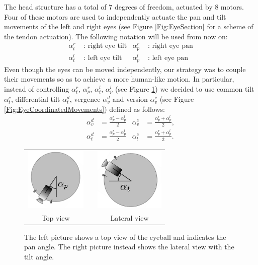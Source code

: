 The head structure has a total of 7 degrees of freedom, actuated by 8 motors. Four of these motors are used to independently actuate the pan and tilt movements of the left and right eyes (see Figure \ref{Fig:EyeSection} for a scheme of the tendon actuation). The following notation will be used from now on:
\begin{align*}
\alpha_t^r & \mbox{ : } \mbox{right eye tilt} & \alpha_p^r & \mbox{ : } \mbox{right eye pan}\\
\alpha_t^l & \mbox{ : } \mbox{left eye tilt} & \alpha_p^l & \mbox{ : } \mbox{left eye pan}
\end{align*}
Even though the eyes can be moved independently, our strategy was to couple their movements so as to achieve a more human-like motion. In particular, instead of controlling $\alpha_t^r$, $\alpha_p^r$, $\alpha_t^l$, $\alpha_p^l$ (see Figure \ref{Fig:EyePanTilt}) we decided to use common tilt $\alpha_t^c$, differential tilt $\alpha_t^d$, vergence $\alpha_v^d$ and version $\alpha_v^c$ (see Figure \ref{Fig:EyeCoordinatedMovements}) defined as follows:
\begin{align*}
\alpha_v^d & = \frac{\alpha_p^r - \alpha_p^l}{2} & \alpha_v^c & = \frac{\alpha_p^r + \alpha_p^l}{2},\\
\alpha_t^d & = \frac{\alpha_p^r - \alpha_p^l}{2} & \alpha_t^c & = \frac{\alpha_p^r + \alpha_p^l}{2}.
\end{align*}

\begin{figure}
  \begin{center}
  \begin{tabular}{ccc}
  \parbox{40mm}{\includegraphics[height=30mm]{Figure/EyePan.jpg}}  & &
  \parbox{40mm}{\includegraphics[height=30mm]{Figure/EyeTilt.jpg}}\\
  Top view & & Lateral view
  \end{tabular}
  \end{center}
  \caption{The left picture shows a top view of the eyeball and indicates the pan angle. The right picture instead shows the lateral view with the tilt angle.}\label{Fig:EyePanTilt}
 \end{figure}

